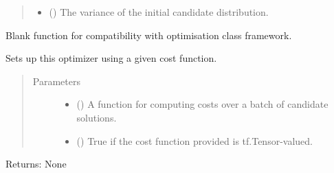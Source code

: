 \documentclass[letterpaper,10pt,english,openany,oneside]{sphinxmanual}
\begin{document}
\begin{fulllineitems}
\begin{fulllineitems}
\begin{quote}
\begin{description}
\begin{itemize}
\item {} 
 () \textendash{} The variance of the initial candidate distribution.

\end{itemize}

\end{description}\end{quote}

\end{fulllineitems}


\begin{fulllineitems}
\label{\detokenize{_modules/misc.optimizers:misc.optimizers.cem.CEMOptimizer.reset}}
Blank function for compatibility with optimisation class framework.

\end{fulllineitems}


\begin{fulllineitems}
\label{\detokenize{_modules/misc.optimizers:misc.optimizers.cem.CEMOptimizer.setup}}
Sets up this optimizer using a given cost function.
\begin{quote}\begin{description}
\item[{Parameters}] \leavevmode\begin{itemize}
\item {} 
 () \textendash{} A function for computing costs over a batch of candidate solutions.

\item {} 
 () \textendash{} True if the cost function provided is tf.Tensor-valued.

\end{itemize}

\end{description}\end{quote}

Returns: None

\end{fulllineitems}


\end{fulllineitems}
\end{document}
